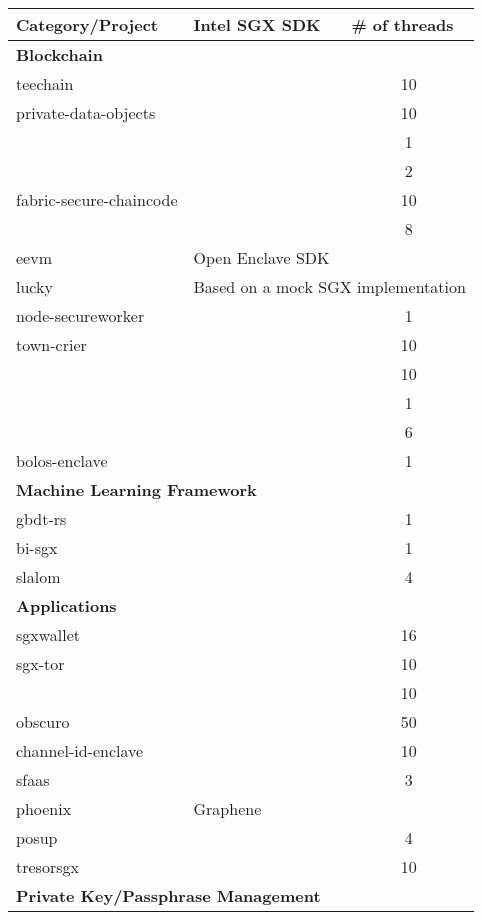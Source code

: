 \begin{table}[t]
	\centering
	\begin{tabular}{lcc}
		\toprule
		\textbf{Category/Project} & \multicolumn{1}{l}{\textbf{Intel SGX SDK}} 
		& 
		\multicolumn{1}{l}{\textbf{\# of threads}} \\ \midrule \midrule
		\multicolumn{3}{l}{\textbf{Blockchain}} \\ \midrule
		teechain & \checkmark & 10 \\
		private-data-objects & \checkmark & 10 \\
		& \checkmark & 1 \\
		& \checkmark & 2 \\
		fabric-secure-chaincode & \checkmark & 10 \\
		& \checkmark & 8 \\
		eevm & \multicolumn{2}{l}{Open Enclave SDK~\cite{openenclave}} \\
		lucky & \multicolumn{2}{l}{Based on a mock SGX implementation} \\
		node-secureworker & \checkmark & 1 \\
		town-crier & \checkmark & 10 \\
		& \checkmark & 10 \\
		& \checkmark & 1 \\
		& \checkmark & 6 \\
		bolos-enclave & \checkmark & 1 \\ \midrule
		\multicolumn{3}{l}{\textbf{Machine Learning Framework}} \\ \midrule
		gbdt-rs & \checkmark & 1 \\
		bi-sgx & \checkmark & 1 \\
		slalom & \checkmark & 4 \\ \midrule
		\multicolumn{3}{l}{\textbf{Applications}} \\ \midrule
		sgxwallet & \checkmark & 16 \\
		sgx-tor & \checkmark & 10 \\
		& \checkmark & 10 \\
		obscuro & \checkmark & 50 \\
		channel-id-enclave & \checkmark & 10 \\
		sfaas & \checkmark & 3 \\
		phoenix & \multicolumn{2}{l}{Graphene~\cite{203255}} \\
		posup & \checkmark & 4 \\
		tresorsgx & \checkmark & 10 \\ \midrule
		\multicolumn{3}{l}{\textbf{Private Key/Passphrase Management}} \\ 

\end{tabular}
\end{table}

